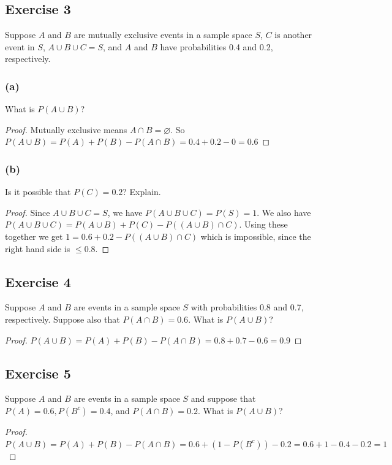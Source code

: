\documentclass[14pt]{extarticle}
\newcommand{\es}{\varnothing}
\begin{document}
\subsection{Exercise 3}
Suppose \(A\) and \(B\) are mutually exclusive events in a sample space \(S\), \(C\) is another event in \(S\),
\(A \cup B \cup C = S\), and \(A\) and \(B\) have probabilities 0.4 and 0.2, respectively.

\subsubsection{(a)}
What is \(P(A \cup B)\)?
\begin{proof}
     Mutually exclusive means \(A \cap B = \es\). So \(P(A \cup B) = P(A) + P(B) - P(A \cap B) = 0.4+0.2-0 = 0.6\)
\end{proof}

\subsubsection{(b)}
Is it possible that \(P(C) = 0.2\)? Explain.
\begin{proof}
     Since \(A \cup B \cup C = S\), we have \(P(A \cup B \cup C) = P(S) = 1\). We also have \(P(A \cup B \cup C) = P(A \cup B) +
     P(C) - P((A \cup B) \cap C)\). Using these together we get \(1 = 0.6 + 0.2 - P((A \cup B) \cap C)\) which is impossible,
     since the right hand side is \(\leq 0.8\).
\end{proof}

\subsection{Exercise 4}
Suppose \(A\) and \(B\) are events in a sample space \(S\) with probabilities 0.8 and 0.7, respectively. Suppose also
that \(P(A \cap B) = 0.6\). What is \(P(A \cup B)\)?

\begin{proof}
     \(P(A \cup B) = P(A) + P(B) - P(A \cap B) = 0.8+0.7-0.6 = 0.9\)
\end{proof}

\subsection{Exercise 5}
Suppose \(A\) and \(B\) are events in a sample space \(S\) and suppose that \(P(A) = 0.6, P(B^c) = 0.4\), and \(P(A \cap B)
= 0.2\). What is \(P(A \cup B)\)?

\begin{proof}
     \(P(A \cup B) = P(A) + P(B) - P(A \cap B) = 0.6 + (1-P(B^c)) - 0.2 = 0.6 + 1 - 0.4 - 0.2 = 1\)
\end{proof}
\end{document}
